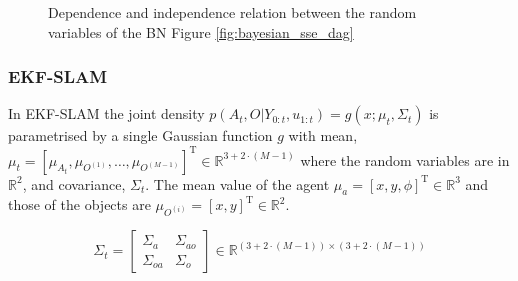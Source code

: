 \begin{figure}
\centering
{}%
\caption{Dependence and independence relation between the random variables of the BN Figure \ref{fig:bayesian_sse_dag}}
 \label{fig:ch5_dseperation}
\end{figure}

\subsubsection{EKF-SLAM}\label{sec:EKF-SLAM}

In EKF-SLAM the joint density $p(A_{t},O|Y_{0:t},u_{1:t}) = g(x;\mu_t,\Sigma_t)$ is parametrised by a single Gaussian function $g$ with mean,
$\mu_t = \left[\mu_{A_{t}},\mu_{O^{(1)}},\dots,\mu_{O^{(M-1)}}\right]^{\mathrm{T}} \in \mathbb{R}^{3 + 2\cdot (M-1)}$  where the 
random variables are in $\mathbb{R}^2$, and covariance, $\Sigma_t$. The mean value of
the agent $\mu_a = [x,y,\phi]^{\mathrm{T}} \in \mathbb{R}^3$ and those of the objects are $\mu_{O^{(i)}} = [x,y]^{\mathrm{T}} \in \mathbb{R}^2$.

\begin{equation}
\Sigma_t = \begin{bmatrix}
       \Sigma_a & \Sigma_{ao}  \\[0.3em]
       \Sigma_{oa} & \Sigma_o
     \end{bmatrix}
     \in \mathbb{R}^{(3 + 2\cdot (M-1)) \times (3 + 2\cdot (M-1))}
\end{equation}

